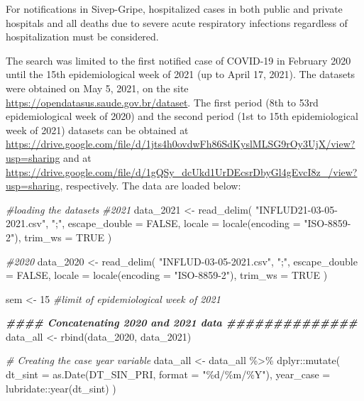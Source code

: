 \documentclass[
]{article}
\newenvironment{Shaded}{\begin{snugshade}}{\end{snugshade}}
\newcommand{\AttributeTok}[1]{\textcolor[rgb]{0.77,0.63,0.00}{#1}}
\newcommand{\CommentTok}[1]{\textcolor[rgb]{0.56,0.35,0.01}{\textit{#1}}}
\newcommand{\ConstantTok}[1]{\textcolor[rgb]{0.00,0.00,0.00}{#1}}
\newcommand{\DecValTok}[1]{\textcolor[rgb]{0.00,0.00,0.81}{#1}}
\newcommand{\DocumentationTok}[1]{\textcolor[rgb]{0.56,0.35,0.01}{\textbf{\textit{#1}}}}
\newcommand{\FunctionTok}[1]{\textcolor[rgb]{0.00,0.00,0.00}{#1}}
\newcommand{\NormalTok}[1]{#1}
\newcommand{\OtherTok}[1]{\textcolor[rgb]{0.56,0.35,0.01}{#1}}
\newcommand{\SpecialCharTok}[1]{\textcolor[rgb]{0.00,0.00,0.00}{#1}}
\newcommand{\StringTok}[1]{\textcolor[rgb]{0.31,0.60,0.02}{#1}}
\begin{document}
For notifications in Sivep-Gripe, hospitalized cases in both public and
private hospitals and all deaths due to severe acute respiratory
infections regardless of hospitalization must be considered.

The search was limited to the first notified case of COVID-19 in
February 2020 until the 15th epidemiological week of 2021 (up to April
17, 2021). The datasets were obtained on May 5, 2021, on the site
\url{https://opendatasus.saude.gov.br/dataset}. The first period (8th to
53rd epidemiological week of 2020) and the second period (1st to 15th
epidemiological week of 2021) datasets can be obtained at
\url{https://drive.google.com/file/d/1jts4h0ovdwFh86SdKyslMLSG9rOy3UjX/view?usp=sharing}
and at
\url{https://drive.google.com/file/d/1gQSy_dcUkd1UrDEcsrDbyGl4gEvcI8z_/view?usp=sharing},
respectively. The data are loaded below:

\begin{Shaded}
\begin{Highlighting}[]
\CommentTok{\#loading the datasets}
\CommentTok{\#2021}
\NormalTok{data\_2021 }\OtherTok{\textless{}{-}} \FunctionTok{read\_delim}\NormalTok{(}
  \StringTok{"INFLUD21{-}03{-}05{-}2021.csv"}\NormalTok{,}
  \StringTok{";"}\NormalTok{,}
  \AttributeTok{escape\_double =} \ConstantTok{FALSE}\NormalTok{,}
  \AttributeTok{locale =} \FunctionTok{locale}\NormalTok{(}\AttributeTok{encoding =} \StringTok{"ISO{-}8859{-}2"}\NormalTok{),}
  \AttributeTok{trim\_ws =} \ConstantTok{TRUE}
\NormalTok{)}

\CommentTok{\#2020}
\NormalTok{data\_2020 }\OtherTok{\textless{}{-}} \FunctionTok{read\_delim}\NormalTok{(}
  \StringTok{"INFLUD{-}03{-}05{-}2021.csv"}\NormalTok{,}
  \StringTok{";"}\NormalTok{,}
  \AttributeTok{escape\_double =} \ConstantTok{FALSE}\NormalTok{,}
  \AttributeTok{locale =} \FunctionTok{locale}\NormalTok{(}\AttributeTok{encoding =} \StringTok{"ISO{-}8859{-}2"}\NormalTok{),}
  \AttributeTok{trim\_ws =} \ConstantTok{TRUE}
\NormalTok{)}

\NormalTok{sem }\OtherTok{\textless{}{-}} \DecValTok{15} \CommentTok{\#limit of epidemiological week of 2021}

\DocumentationTok{\#\#\#\# Concatenating 2020 and 2021 data \#\#\#\#\#\#\#\#\#\#\#\#\#\#}
\NormalTok{data\_all }\OtherTok{\textless{}{-}} \FunctionTok{rbind}\NormalTok{(data\_2020, data\_2021)}

\CommentTok{\# Creating the case year variable}
\NormalTok{data\_all }\OtherTok{\textless{}{-}}\NormalTok{  data\_all }\SpecialCharTok{\%\textgreater{}\%}
\NormalTok{  dplyr}\SpecialCharTok{::}\FunctionTok{mutate}\NormalTok{(}
    \AttributeTok{dt\_sint =} \FunctionTok{as.Date}\NormalTok{(DT\_SIN\_PRI, }\AttributeTok{format =} \StringTok{"\%d/\%m/\%Y"}\NormalTok{),}
    \AttributeTok{year\_case =}\NormalTok{ lubridate}\SpecialCharTok{::}\FunctionTok{year}\NormalTok{(dt\_sint)}
\NormalTok{  )}
\end{Highlighting}
\end{Shaded}
\end{document}
